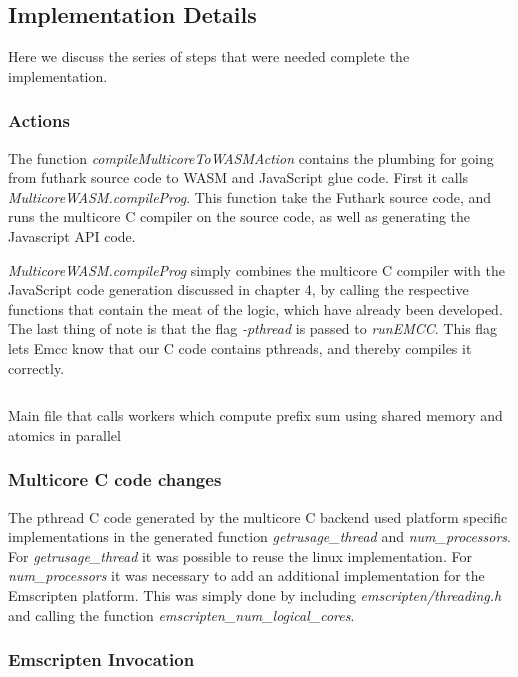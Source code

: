 \documentclass[11pt]{article}
\begin{document}
\subsection{Implementation Details}
Here we discuss the series of steps that were needed complete the implementation.
\subsubsection{Actions}

The function \textit{compileMulticoreToWASMAction} contains the plumbing for going from futhark source code to WASM and JavaScript glue code. First it calls \textit{MulticoreWASM.compileProg}. This function take the Futhark source code, and runs the multicore C compiler on the source code, as well as generating the Javascript API code.

\textit{MulticoreWASM.compileProg} simply combines the multicore C compiler with the JavaScript code generation discussed in chapter 4, by calling the respective functions that contain the meat of the logic, which have already been developed. The last thing of note is that the flag \textit{-pthread} is passed to \textit{runEMCC}. This flag lets Emcc know that our C code contains pthreads, and thereby compiles it correctly.


\begin{listing}[H]    
        \inputminted[fontsize=\small,baselinestretch=0.5,linenos]{haskell}{code/actionmc.hs}
        \caption{Main file that calls workers which compute prefix sum using shared memory and atomics in parallel}    
        \label{lst:action-mc}    
\end{listing}    
\subsubsection{Multicore C code changes}
The pthread C code generated by the multicore C backend used platform specific implementations in the generated function \textit{getrusage\_thread} and \textit{num\_processors}. For \textit{getrusage\_thread} it was possible to reuse the linux implementation. For \textit{num\_processors} it was necessary to add an additional implementation for the Emscripten platform. This was simply done by including \textit{emscripten/threading.h} and calling the function \textit{emscripten\_num\_logical\_cores}.




\subsubsection{Emscripten Invocation}
\end{document}
